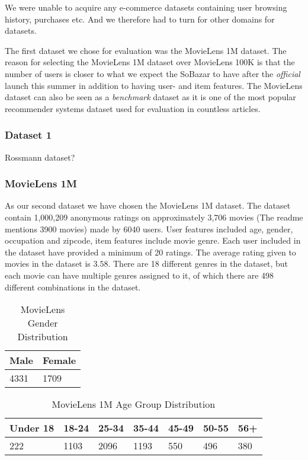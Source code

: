 We were unable to acquire any e-commerce datasets containing user browsing history, purchases etc. And we therefore had to turn for other domains for datasets.

The first dataset we chose for evaluation was the MovieLens 1M dataset. The reason for selecting the MovieLens 1M dataset over MovieLens 100K is that the number of users is closer to what we expect the SoBazar to have after the \emph{official} launch this summer in addition to having user- and item features. The MovieLens dataset can also be seen as a \emph{benchmark} dataset as it is one of the most popular recommender systems dataset used for evaluation in countless articles.

\subsubsection{Dataset 1}

Rossmann dataset?

\subsubsection{MovieLens 1M}

As our second dataset we have chosen the MovieLens 1M dataset. The dataset contain 1,000,209 anonymous ratings on approximately 3,706 movies (The readme mentions 3900 movies) made by 6040 users. User features included age, gender, occupation and zipcode, item features include movie genre. Each user included in the dataset have provided a minimum of 20 ratings. The average rating given to movies in the dataset is $3.58$. There are 18 different genres in the dataset, but each movie can have multiple genres assigned to it, of which there are 498 different combinations in the dataset.

\begin{table}[H]
\centering
\begin{tabular}{|l|l|}
\hline
Male & Female \\ \hline
4331 & 1709 \\ \hline
\end{tabular}
\caption{MovieLens Gender Distribution}
\end{table}

\begin{table}[H]
\centering
\begin{tabular}{|l|l|l|l|l|l|l|}
\hline
Under 18 & 18-24 & 25-34 	& 35-44 	& 45-49 & 50-55 & 56+ \\ \hline
222		 &	1103 &	2096	&	1193	& 550	& 496	& 380 \\ \hline
\end{tabular}
\caption{MovieLens 1M Age Group Distribution}
\end{table}

